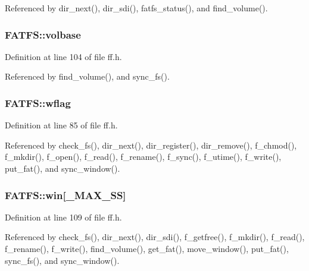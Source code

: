 Referenced by dir\-\_\-next(), dir\-\_\-sdi(), fatfs\-\_\-status(), and find\-\_\-volume().

\hypertarget{structFATFS_a8f0ca578755749d204f59dc83f1a7649}{
\subsubsection[{volbase}]{ F\-A\-T\-F\-S\-::volbase}}\label{structFATFS_a8f0ca578755749d204f59dc83f1a7649}


Definition at line 104 of file ff.\-h.



Referenced by find\-\_\-volume(), and sync\-\_\-fs().

\hypertarget{structFATFS_a647e43c9ccae94b7274793d1909897de}{
\subsubsection[{wflag}]{ F\-A\-T\-F\-S\-::wflag}}\label{structFATFS_a647e43c9ccae94b7274793d1909897de}


Definition at line 85 of file ff.\-h.



Referenced by check\-\_\-fs(), dir\-\_\-next(), dir\-\_\-register(), dir\-\_\-remove(), f\-\_\-chmod(), f\-\_\-mkdir(), f\-\_\-open(), f\-\_\-read(), f\-\_\-rename(), f\-\_\-sync(), f\-\_\-utime(), f\-\_\-write(), put\-\_\-fat(), and sync\-\_\-window().

\hypertarget{structFATFS_a7cc35a593465e727ab87723c14610644}{
\subsubsection[{win}]{ F\-A\-T\-F\-S\-::win\mbox{[}{\bf \-\_\-\-M\-A\-X\-\_\-\-S\-S}\mbox{]}}}\label{structFATFS_a7cc35a593465e727ab87723c14610644}


Definition at line 109 of file ff.\-h.



Referenced by check\-\_\-fs(), dir\-\_\-next(), dir\-\_\-sdi(), f\-\_\-getfree(), f\-\_\-mkdir(), f\-\_\-read(), f\-\_\-rename(), f\-\_\-write(), find\-\_\-volume(), get\-\_\-fat(), move\-\_\-window(), put\-\_\-fat(), sync\-\_\-fs(), and sync\-\_\-window().

